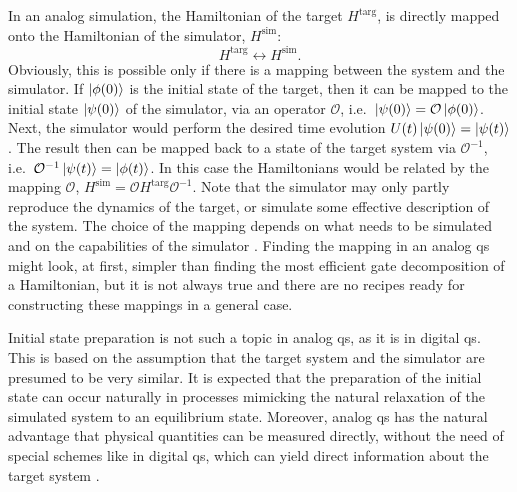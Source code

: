 In an analog simulation, the Hamiltonian of the target $H^{\text{targ}}$, is directly mapped onto the Hamiltonian of the simulator, $H^{\text{sim}}$:
\begin{equation*}
    H^{\text{targ}} \longleftrightarrow H^{\text{sim}}.
\end{equation*}
Obviously, this is possible only if there is a mapping between the system and the simulator.
If $\ket{\phi(0)}$ is the initial state of the target, then it can be mapped to the initial state $\ket{\psi(0)}$ of the simulator, via an operator $\mathcal{O}$, i.e.~$\ket{\psi(0)} = \mathcal{O} \ket{\phi(0)}$.
Next, the simulator would perform the desired time evolution $U(t) \ket{\psi(0)} = \ket{\psi(t)}$.
The result then can be mapped back to a state of the target system via $\mathcal{O}^{-1}$, i.e.~$\mathcal{O}^{-1}\ket{\psi(t)} = \ket{\phi(t)}$.
In this case the Hamiltonians would be related by the mapping $\mathcal{O}$, $H^{\text{sim}} = \mathcal{O} H^{\text{targ}} \mathcal{O}^{-1}$.
Note that the simulator may only partly reproduce the dynamics of the target, or simulate some effective description of the system.
The choice of the mapping depends on what needs to be simulated and on the capabilities of the simulator \cite{georgescu2014simulation}.
Finding the mapping in an analog \ac{qs} might look, at first, simpler than finding the most efficient gate decomposition of a Hamiltonian, but it is not always true and there are no recipes ready for constructing these mappings in a general case.

Initial state preparation is not such a topic in analog \ac{qs}, as it is in digital \ac{qs}.
This is based on the assumption that the target system and the simulator are presumed to be very similar.
It is expected that the preparation of the initial state can occur naturally in processes mimicking the natural relaxation of the simulated system to an equilibrium state.
Moreover, analog \ac{qs} has the natural advantage that physical quantities can be measured directly, without the need of special schemes like in digital \ac{qs}, which can yield direct information about the target system \cite{hauke2012simulators}.

